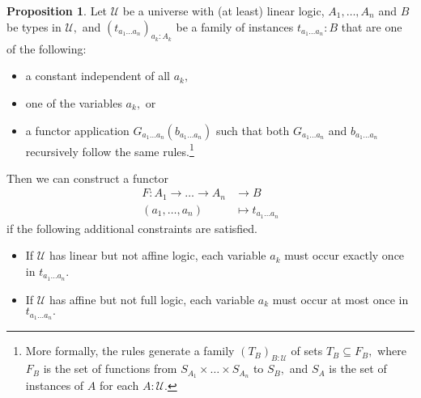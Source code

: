\documentclass[a4paper]{article}
\theoremstyle{definition}
\newtheorem{proposition}[definition]{Proposition}
\theoremstyle{remark}
\newcommand{\U}{\mathcal{U}}
\begin{document}
\begin{proposition}
  \label{prp:layer1-functoriality}
  Let $\U$ be a universe with (at least) linear logic, $A_1,\dots,A_n$ and $B$ be types in $\U,$
  and $(t_{a_1 \dots a_n})_{a_k : A_k}$ be a family of instances $t_{a_1 \dots a_n} : B$
  that are one of the following:
  \begin{itemize}
    \item a constant independent of all $a_k,$
    \item one of the variables $a_k,$ or
    \item a functor application $G_{a_1 \dots a_n}(b_{a_1 \dots a_n})$ such that both
    $G_{a_1 \dots a_n}$ and $b_{a_1 \dots a_n}$ recursively follow the same rules.\footnote{More
    formally, the rules generate a family $(T_B)_{B : \U}$ of sets $T_B \subseteq F_B,$ where
    $F_B$ is the set of functions from $S_{A_1} \times \dots \times S_{A_n}$ to $S_B,$ and $S_A$ is
    the set of instances of $A$ for each $A : \U.$}
  \end{itemize}
  Then we can construct a functor
  \begin{align*}
    F : A_1 \to \dots \to A_n &\to     B\\
        (a_1,\dots,a_n)       &\mapsto t_{a_1 \dots a_n}
  \end{align*}
  if the following additional constraints are satisfied.
  \begin{itemize}
    \item If $\U$ has linear but not affine logic, each variable $a_k$ must occur exactly once in
    $t_{a_1 \dots a_n}.$
    \item If $\U$ has affine but not full logic, each variable $a_k$ must occur at most once
    in $t_{a_1 \dots a_n}.$
  \end{itemize}
\end{proposition}
\end{document}
